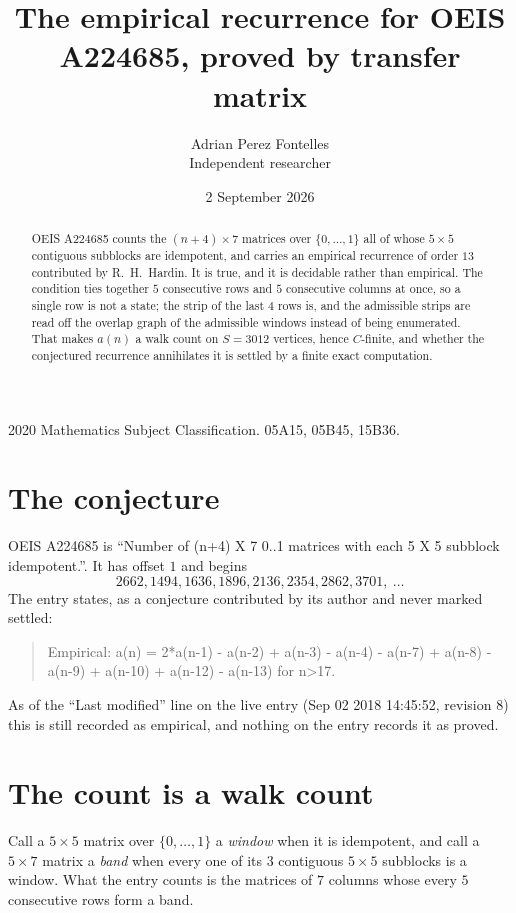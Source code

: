 \documentclass[11pt,a4paper]{article}
\title{The empirical recurrence for OEIS A224685, proved by transfer matrix}
\author{Adrian Perez Fontelles\\ \small Independent researcher}
\date{2 September 2026}
\theoremstyle{plain}
\theoremstyle{definition}
\begin{document}
\maketitle

\begin{abstract}
OEIS A224685 counts the $(n+4)\times7$ matrices over $\{0,\dots,1\}$ all of whose
$5\times5$ contiguous subblocks are idempotent, and carries an empirical recurrence of order
$13$ contributed by R.~H.~Hardin. It is true, and it is decidable rather than empirical.
The condition ties together $5$ consecutive rows and $5$ consecutive columns at once, so a
single row is not a state; the strip of the last $4$ rows is, and the admissible strips
are read off the overlap graph of the admissible windows instead of being enumerated. That
makes $a(n)$ a walk count on $S=3012$ vertices, hence $C$-finite, and whether the conjectured
recurrence annihilates it is settled by a finite exact computation.
\end{abstract}

\noindent\small 2020 Mathematics Subject Classification. 05A15, 05B45, 15B36.\normalsize

\section{The conjecture}

OEIS A224685 is ``Number of (n+4) X 7 0..1 matrices with each 5 X 5 subblock idempotent.''. It has offset $1$ and begins
\[
2662, 1494, 1636, 1896, 2136, 2354, 2862, 3701,\ \dots
\]
The entry states, as a conjecture contributed by its author and never marked settled:
\begin{quote}
Empirical: a(n) = 2*a(n-1) - a(n-2) + a(n-3) - a(n-4) - a(n-7) + a(n-8) -a(n-9) + a(n-10) + a(n-12) - a(n-13) for n>17.
\end{quote}
As of the ``Last modified'' line on the live entry (Sep 02 2018 14:45:52, revision 8) this is still
recorded as empirical, and nothing on the entry records it as proved.

\section{The count is a walk count}

Call a $5\times5$ matrix over $\{0,\dots,1\}$ a \emph{window} when it is idempotent, and
call a $5\times7$ matrix a \emph{band} when every one of its $3$ contiguous
$5\times5$ subblocks is a window. What the entry counts is the matrices of $7$ columns
whose every $5$ consecutive rows form a band.
\end{document}
